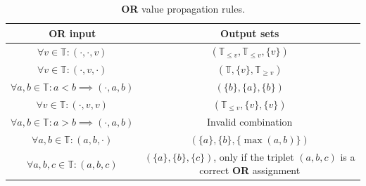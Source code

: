 \begin{table}[h!]
    \centering
    \begin{tabular}{|c|c|}
        \hline
        \rowcolor[HTML]{EAE1E1}
        {\color[HTML]{333333} \textbf{OR input}}                   & {\color[HTML]{333333} \textbf{Output sets}}                                                 \\ \hline
        $\forall v \in \mathbb{T}: (\cdot, \cdot, v)$              & $(\mathbb{T}_{\leq v},\mathbb{T}_{\leq v}, \{v\} )$                                         \\ \hline
        $\forall v \in \mathbb{T}: (\cdot, v, \cdot)$              & $(\mathbb{T}, \{v\}, \mathbb{T}_{\geq v})$                                                  \\ \hline
        $\forall a,b \in \mathbb{T}: a < b \implies (\cdot, a, b)$ & $(\{b\}, \{a\}, \{b\})$                                                                     \\ \hline
        $\forall v \in \mathbb{T}: (\cdot, v, v)$                  & $(\mathbb{T}_{\leq v}, \{v\}, \{v\})$                                                       \\ \hline
        $\forall a,b \in \mathbb{T}:a > b \implies (\cdot, a, b)$  & Invalid combination                                                                         \\ \hline
        $\forall a,b \in \mathbb{T}: (a, b, \cdot)$                & $(\{a\}, \{b\}, \{\max(a,b) \})$                                                            \\ \hline
        $\forall a,b,c \in \mathbb{T}:  (a, b, c)$                 & $(\{a\}, \{b\}, \{c \})$, only if the triplet $(a,b,c)$ is a correct \textbf{OR} assignment \\ \hline
    \end{tabular}
    \caption{\textbf{OR} value propagation rules.}
    \label{tab:chap-4:or-propagation}
\end{table}


